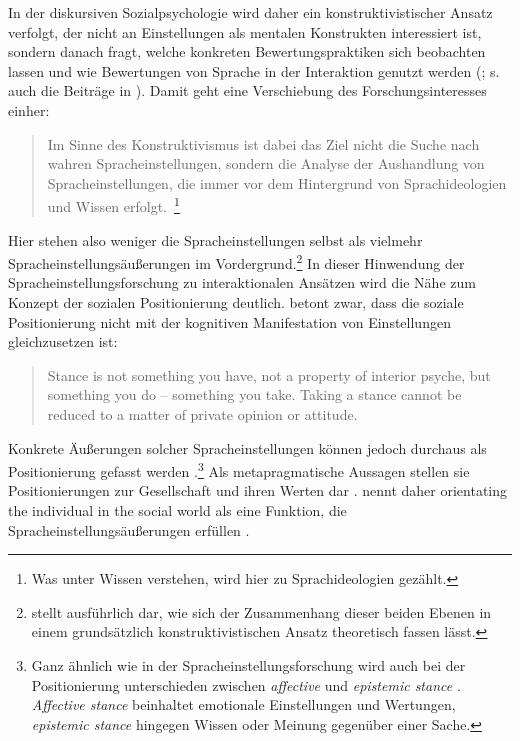 In der diskursiven Sozialpsychologie wird daher ein konstruktivistischer Ansatz verfolgt, der nicht an Einstellungen als mentalen Konstrukten interessiert ist, sondern danach fragt, welche konkreten Bewertungspraktiken sich beobachten lassen und wie Bewertungen von Sprache in der Interaktion genutzt werden (\citealp[s.][234]{Potter.1998}; s. auch die Beiträge in \citealp{Cuonz.2014b}). 
Damit geht eine Verschiebung des Forschungsinteresses einher: 
\begin{quote}Im Sinne des Konstruktivismus ist dabei das Ziel nicht die Suche nach \glqq wahren\grqq{} Spracheinstellungen, sondern die Analyse der Aushandlung von Spracheinstellungen, die immer vor dem Hintergrund von Sprachideologien und Wissen erfolgt.~\citep[109]{Liebscher.2014}\footnote{Was \citet{Liebscher.2014} unter Wissen verstehen, wird hier zu Sprachideologien gezählt.} \end{quote} 
Hier stehen also weniger die Spracheinstellungen selbst als vielmehr Spracheinstellungsäußerungen im Vordergrund.\footnote{\citet[146--149]{Soukup.2014} stellt ausführlich dar, wie sich der Zusammenhang dieser beiden Ebenen in einem grundsätzlich konstruktivistischen Ansatz theoretisch fassen lässt.} 
In dieser Hinwendung der Spracheinstellungsforschung zu interaktionalen Ansätzen wird die Nähe  zum Konzept der sozialen Positionierung deutlich. 
\citet{DuBois.2007} betont zwar, dass die soziale Positionierung nicht mit der kognitiven Manifestation von Einstellungen gleichzusetzen ist: 
\begin{quote}Stance is not something you have, not a property of interior psyche, but something you do -- something you take. Taking a stance cannot be reduced to a matter of private opinion or attitude.~\citep[171]{DuBois.2007}\end{quote}
Konkrete Äußerungen solcher Spracheinstellungen können jedoch durchaus als Positionierung gefasst werden \citep[s.][109]{Liebscher.2014}.\footnote{Ganz ähnlich wie in der Spracheinstellungsforschung wird auch bei der Positionierung unterschieden zwischen \textit{affective }und \textit{epistemic stance} \citep[s. etwa][410]{Ochs1996}. \textit{Affective stance} beinhaltet emotionale Einstellungen und Wertungen, \textit{epistemic stance} hingegen Wissen oder Meinung gegen{\"u}ber einer Sache.}
Als metapragmatische Aussagen stellen sie Positionierungen zur Gesellschaft und ihren Werten dar \citep[s.][258]{Spitzmuller.2005}.
\citet[401]{Lasagabaster.2005} nennt daher \glqq orientating the individual in the social world\grqq{} als eine Funktion, die %
Spracheinstellungsäußerungen %
erfüllen \citep[ähnlich auch][206]{Tophinke.2006}. 

